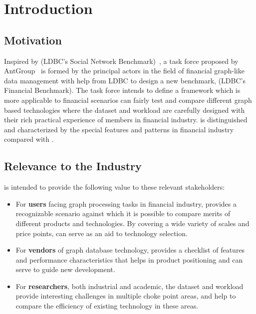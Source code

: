 \chapter{Introduction}
\label{sec:introduction}


\section{Motivation}

Inspired by \ldbcsnb(LDBC's Social Network Benchmark)~\cite{DBLP:journals/corr/abs-2001-02299,
    ldbc_snb_docs}, a task force proposed by AntGroup~\cite{antgroup} is formed by the principal
actors in the field of financial graph-like data management with help from LDBC to design a
new benchmark, \ldbcfinbench(LDBC's Financial Benchmark). The task force intends to define a
framework which is more applicable to financial scenarios can fairly test and compare different
graph based technologies where the dataset and workload are carefully designed with their rich
practical experience of members in financial industry. \ldbcfinbench is distinguished and
characterized by the special features and patterns in financial industry compared with \ldbcsnb.


\section{Relevance to the Industry}

\ldbcfinbench is intended to provide the following value to these relevant
stakeholders:

\begin{itemize}
    \item For \textbf{users} facing graph processing tasks in financial industry,
          \ldbcfinbench provides a recognizable scenario against which it is possible
          to compare merits of different products and technologies. By covering a wide
          variety of scales and price points, \ldbcfinbench can serve as an aid to
          technology selection.
    \item For \textbf{vendors} of graph database technology, \ldbcfinbench provides a
          checklist of features and performance characteristics that helps in product
          positioning and can serve to guide new development.
    \item For \textbf{researchers}, both industrial and academic, the \ldbcfinbench
          dataset and workload provide interesting challenges in multiple choke point
          areas, and help to compare the efficiency of existing technology in these
          areas.
\end{itemize}

